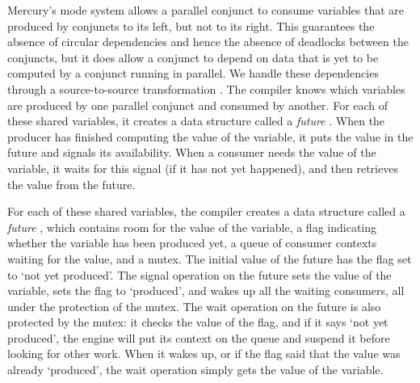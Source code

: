 %

Mercury's mode system allows a parallel conjunct to consume variables
that are produced by conjuncts to its left, but not to its right.
This guarantees the absence of circular dependencies
and hence the absence of deadlocks between the conjuncts,
but it does allow a conjunct to depend on data that is yet to be computed
by a conjunct running in parallel.
We handle these dependencies through a source-to-source transformation
\cite{wang_dep_par_conj}.
The compiler knows which variables
are produced by one parallel conjunct and consumed by another.
For each of these shared variables,
it creates a data structure called a \emph{future} \cite{multilisp}.
When the producer has finished computing the value of the variable,
it puts the value in the future and signals its availability.
When a consumer needs the value of the variable,
it waits for this signal (if it has not yet happened),
and then retrieves the value from the future.

For each of these shared variables,
the compiler creates a data structure called a \emph{future} \cite{multilisp},
which contains room for the value of the variable,
a flag indicating whether the variable has been produced yet,
a queue of consumer contexts waiting for the value, and a mutex.
The initial value of the future has the flag set to `not yet produced'.
The signal operation on the future sets the value of the variable,
sets the flag to `produced',
and wakes up all the waiting consumers,
all under the protection of the mutex.
The wait operation on the future is also protected by the mutex:
it checks the value of the flag,
and if it says `not yet produced',
the engine will put its context on the queue and suspend it before
looking for other work.
When it wakes up,
or if the flag said that the value was already `produced',
the wait operation simply gets the value of the variable.

